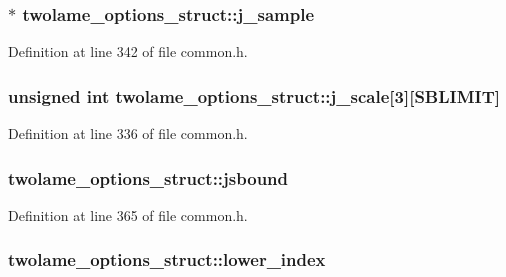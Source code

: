 \subsubsection[{\texorpdfstring{j\+\_\+sample}{j_sample}}]{$\ast$ twolame\+\_\+options\+\_\+struct\+::j\+\_\+sample}\hypertarget{structtwolame__options__struct_ac22600520036c32486e6d026310a5f08}{}\label{structtwolame__options__struct_ac22600520036c32486e6d026310a5f08}


Definition at line 342 of file common.\+h.

\subsubsection[{\texorpdfstring{j\+\_\+scale}{j_scale}}]{\setlength{\rightskip}{0pt plus 5cm}unsigned {\bf int} twolame\+\_\+options\+\_\+struct\+::j\+\_\+scale\mbox{[}3\mbox{]}\mbox{[}{\bf S\+B\+L\+I\+M\+IT}\mbox{]}}\hypertarget{structtwolame__options__struct_aba04b12dc6567e0f23cdbd5993adfd43}{}\label{structtwolame__options__struct_aba04b12dc6567e0f23cdbd5993adfd43}


Definition at line 336 of file common.\+h.

\subsubsection[{\texorpdfstring{jsbound}{jsbound}}]{ twolame\+\_\+options\+\_\+struct\+::jsbound}\hypertarget{structtwolame__options__struct_ad177ef737c518ac27a6a76085ec47b40}{}\label{structtwolame__options__struct_ad177ef737c518ac27a6a76085ec47b40}


Definition at line 365 of file common.\+h.

\subsubsection[{\texorpdfstring{lower\+\_\+index}{lower_index}}]{ twolame\+\_\+options\+\_\+struct\+::lower\+\_\+index}\hypertarget{structtwolame__options__struct_a45ea79a96f9cbbfd47e718573f1f897b}{}\label{structtwolame__options__struct_a45ea79a96f9cbbfd47e718573f1f897b}


